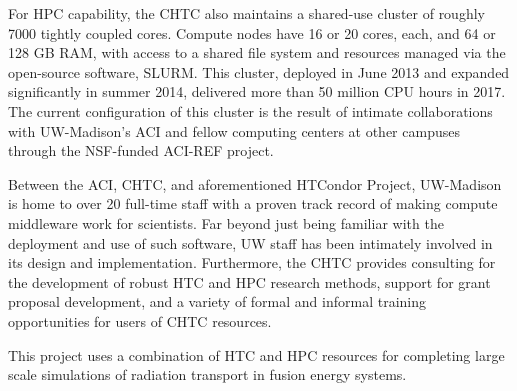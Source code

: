 For \gls{HPC} capability, the \gls{CHTC} also maintains a shared-use cluster
of roughly 7000 tightly coupled cores. Compute nodes have 16 or 20 cores,
each, and 64 or 128 GB RAM, with access to a shared file system and resources
managed via the open-source software, SLURM. This cluster, deployed in June
2013 and expanded significantly in summer 2014, delivered more than 50 million
CPU hours in 2017. The current configuration of this cluster is the result of
intimate collaborations with UW-Madison's \gls{ACI} and fellow computing
centers at other campuses through the NSF-funded ACI-REF project.

Between the \gls{ACI}, \gls{CHTC}, and aforementioned HTCondor Project,
UW-Madison is home to over 20 full-time staff with a proven track record of
making compute middleware work for scientists. Far beyond just being familiar
with the deployment and use of such software, UW staff has been intimately
involved in its design and implementation. Furthermore, the \gls{CHTC}
provides consulting for the development of robust \gls{HTC} and \gls{HPC}
research methods, support for grant proposal development, and a variety of
formal and informal training opportunities for users of \gls{CHTC} resources.

This project uses a combination of \gls{HTC} and \gls{HPC} resources for
completing large scale simulations of radiation transport in fusion energy
systems.
